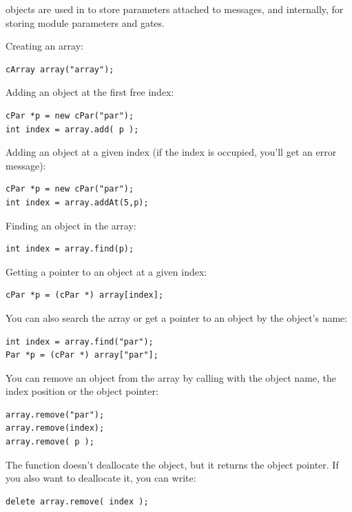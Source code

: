 objects are used in {\opp} to store parameters
attached to messages, and internally, for storing module parameters
and gates.


Creating an array:

\begin{verbatim}
cArray array("array");
\end{verbatim}

Adding an object at the first free index:

\begin{verbatim}
cPar *p = new cPar("par");
int index = array.add( p );
\end{verbatim}


Adding an object at a given index (if the index is occupied,
you'll get an error message):

\begin{verbatim}
cPar *p = new cPar("par");
int index = array.addAt(5,p);
\end{verbatim}


Finding an object in the array:

\begin{verbatim}
int index = array.find(p);
\end{verbatim}

Getting a pointer to an object at a given index:

\begin{verbatim}
cPar *p = (cPar *) array[index];
\end{verbatim}

You can also search the array or get a pointer to an object by
the object's name:

\begin{verbatim}
int index = array.find("par");
Par *p = (cPar *) array["par"];
\end{verbatim}


You can remove an object from the array by calling 
with the object name, the index position or the object pointer:

\begin{verbatim}
array.remove("par");
array.remove(index);
array.remove( p );
\end{verbatim}


The  function doesn't deallocate the object, but it
returns the object pointer. If you also want to deallocate it, you can
write:

\begin{verbatim}
delete array.remove( index );
\end{verbatim}

